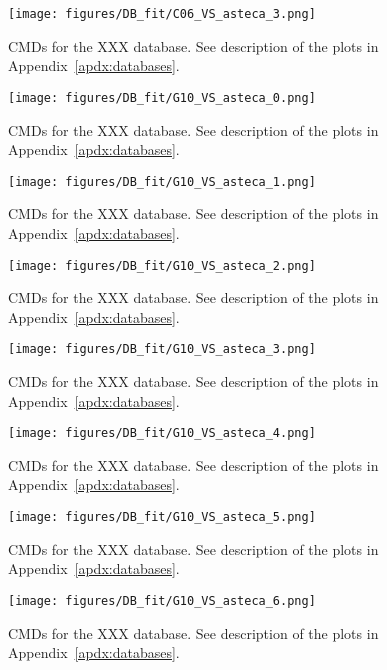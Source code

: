 \documentclass[a4paper,fleqn,usenatbib]{mnras}
\begin{document}
\begin{figure}
\texttt{[image: figures/DB\_fit/C06\_VS\_asteca\_3.png]}
\caption{CMDs for the XXX database. See description of the plots in
Appendix~\ref{apdx:databases}.}
\label{fig:DBs_C06_3}
\end{figure}

\begin{figure*}
\texttt{[image: figures/DB\_fit/G10\_VS\_asteca\_0.png]}
\caption{CMDs for the XXX database. See description of the plots in
Appendix~\ref{apdx:databases}.}
\label{fig:DBs_G10_0}
\end{figure*}

\begin{figure*}
\texttt{[image: figures/DB\_fit/G10\_VS\_asteca\_1.png]}
\caption{CMDs for the XXX database. See description of the plots in
Appendix~\ref{apdx:databases}.}
\label{fig:DBs_G10_1}
\end{figure*}

\begin{figure*}
\texttt{[image: figures/DB\_fit/G10\_VS\_asteca\_2.png]}
\caption{CMDs for the XXX database. See description of the plots in
Appendix~\ref{apdx:databases}.}
\label{fig:DBs_G10_2}
\end{figure*}

\begin{figure*}
\texttt{[image: figures/DB\_fit/G10\_VS\_asteca\_3.png]}
\caption{CMDs for the XXX database. See description of the plots in
Appendix~\ref{apdx:databases}.}
\label{fig:DBs_G10_3}
\end{figure*}

\begin{figure*}
\texttt{[image: figures/DB\_fit/G10\_VS\_asteca\_4.png]}
\caption{CMDs for the XXX database. See description of the plots in
Appendix~\ref{apdx:databases}.}
\label{fig:DBs_G10_4}
\end{figure*}

\begin{figure*}
\texttt{[image: figures/DB\_fit/G10\_VS\_asteca\_5.png]}
\caption{CMDs for the XXX database. See description of the plots in
Appendix~\ref{apdx:databases}.}
\label{fig:DBs_G10_5}
\end{figure*}

\begin{figure*}
\texttt{[image: figures/DB\_fit/G10\_VS\_asteca\_6.png]}
\caption{CMDs for the XXX database. See description of the plots in
Appendix~\ref{apdx:databases}.}
\label{fig:DBs_G10_6}
\end{figure*}
\end{document}
